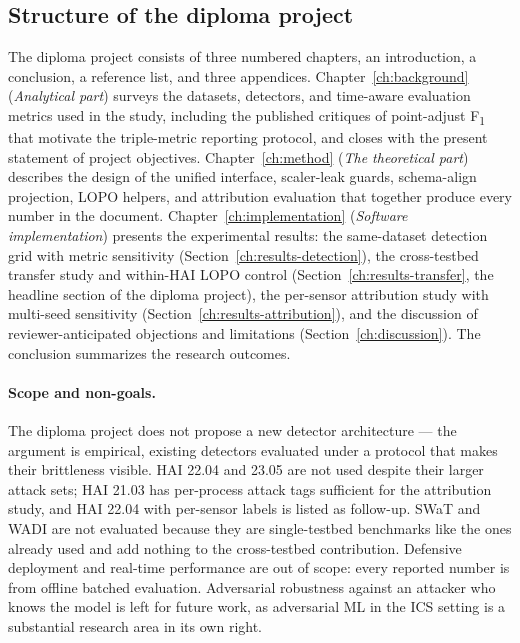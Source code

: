 \subsection{Structure of the diploma project}
\label{sec:structure}

The diploma project consists of three numbered chapters, an introduction, a conclusion, a reference list, and three appendices.  Chapter~\ref{ch:background} (\emph{Analytical part}) surveys the datasets, detectors, and time-aware evaluation metrics used in the study, including the published critiques of point-adjust F\textsubscript{1} that motivate the triple-metric reporting protocol, and closes with the present statement of project objectives.  Chapter~\ref{ch:method} (\emph{The theoretical part}) describes the design of the unified  interface, scaler-leak guards, schema-align projection, LOPO helpers, and attribution evaluation that together produce every number in the document.  Chapter~\ref{ch:implementation} (\emph{Software implementation}) presents the experimental results: the same-dataset detection grid with metric sensitivity (Section~\ref{ch:results-detection}), the cross-testbed transfer study and within-HAI LOPO control (Section~\ref{ch:results-transfer}, the headline section of the diploma project), the per-sensor attribution study with multi-seed sensitivity (Section~\ref{ch:results-attribution}), and the discussion of reviewer-anticipated objections and limitations (Section~\ref{ch:discussion}).  The conclusion summarizes the research outcomes.

\paragraph{Scope and non-goals.}  The diploma project does not propose a new detector architecture --- the argument is empirical, existing detectors evaluated under a protocol that makes their brittleness visible.  HAI 22.04 and 23.05 are not used despite their larger attack sets; HAI 21.03 has per-process attack tags sufficient for the attribution study, and HAI 22.04 with per-sensor labels is listed as follow-up.  SWaT and WADI are not evaluated because they are single-testbed benchmarks like the ones already used and add nothing to the cross-testbed contribution.  Defensive deployment and real-time performance are out of scope: every reported number is from offline batched evaluation.  Adversarial robustness against an attacker who knows the model is left for future work, as adversarial ML in the ICS setting is a substantial research area in its own right.
